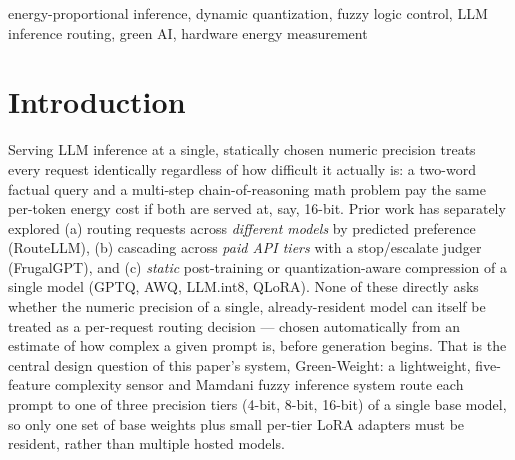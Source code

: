 \documentclass[conference]{IEEEtran}
\begin{document}
\begin{abstract}
worth building at all. The routing energy/accuracy tradeoff and baseline
comparisons against naive routers (RQ2/RQ3) have now been measured twice
(Session 4, 2026-09-05, jobs 1505 and 1507), but neither run passed this
project's own validation gate: both were run under diagnosed shared-node
contention, and a separate, real defect in the routing controller's
tie-break logic was diagnosed from the same data. We report both findings
--- the contention's effect on the energy figures, and the defect's effect
on accuracy and energy --- as an honest interim status, not an answered
result: the runs that will actually settle RQ2/RQ3 are scheduled after the
defect's fix, on a confirmed-quiet node. A quantization-aware-training
adapter ablation (RQ4) remains open and not yet executed. We report exact
protocols throughout so the remaining results can be added without
redesigning the system, and we are explicit at every stage about what is
and is not yet known.
\end{abstract}

\begin{IEEEkeywords}
energy-proportional inference, dynamic quantization, fuzzy logic control,
LLM inference routing, green AI, hardware energy measurement
\end{IEEEkeywords}

\section{Introduction}
\label{sec:intro}

Serving LLM inference at a single, statically chosen numeric precision
treats every request identically regardless of how difficult it actually
is: a two-word factual query and a multi-step chain-of-reasoning math
problem pay the same per-token energy cost if both are served at, say,
16-bit. Prior work has separately explored (a) routing requests across
\emph{different models} by predicted preference (RouteLLM), (b) cascading
across \emph{paid API tiers} with a stop/escalate judger (FrugalGPT), and
(c) \emph{static} post-training or quantization-aware compression of a
single model (GPTQ, AWQ, LLM.int8, QLoRA). None of these directly asks
whether the numeric precision of a single, already-resident model can
itself be treated as a per-request routing decision --- chosen
automatically from an estimate of how complex a given prompt is, before
generation begins. That is the central design question of this paper's
system, Green-Weight: a lightweight, five-feature complexity sensor and
Mamdani fuzzy inference system route each prompt to one of three precision
tiers (4-bit, 8-bit, 16-bit) of a single base model, so only one set of
base weights plus small per-tier LoRA adapters must be resident, rather
than multiple hosted models.
\end{document}
